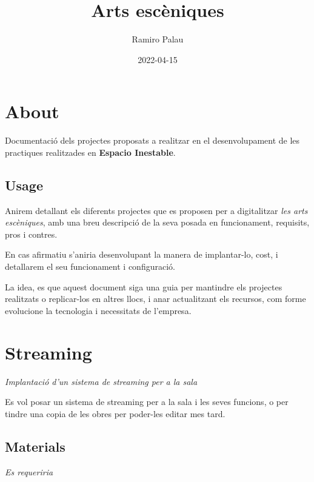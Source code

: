 \documentclass[
  10pt, krantz2,
]{krantz}
\title{Arts escèniques}
\author{Ramiro Palau}
\date{2022-04-15}
\begin{document}
\maketitle

{
\hypersetup{linkcolor=}
\setcounter{tocdepth}{2}
\tableofcontents
}
\hypertarget{about}{%
\chapter*{About}\label{about}}


Documentació dels projectes proposats a realitzar en el desenvolupament de les practiques realitzades en \textbf{Espacio Inestable}.

\hypertarget{usage}{%
\section*{Usage}\label{usage}}


Anirem detallant els diferents projectes que es proposen per a digitalitzar \emph{les arts escèniques}, amb una breu descripció de la seva posada en funcionament, requisits, pros i contres.

En cas afirmatiu s'aniria desenvolupant la manera de implantar-lo, cost, i detallarem el seu funcionament i configuració.

La idea, es que aquest document siga una guia per mantindre els projectes realitzats o replicar-los en altres llocs, i anar actualitzant els recursos, com forme evolucione la tecnologia i necessitats de l'empresa.

\hypertarget{streaming}{%
\chapter{Streaming}\label{streaming}}

\emph{Implantació d'un sistema de streaming per a la sala}

Es vol posar un sistema de streaming per a la sala i les seves funcions, o per tindre una copia de les obres per poder-les editar mes tard.

\hypertarget{materials}{%
\section{Materials}\label{materials}}

\emph{Es requeriria}
\end{document}
